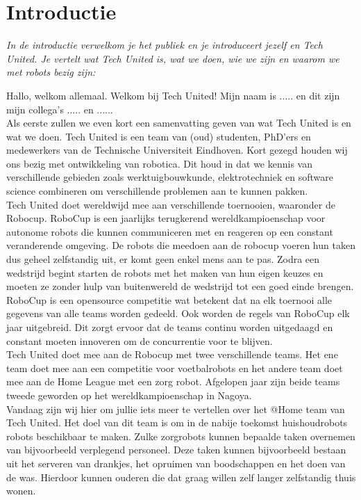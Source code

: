 \documentclass[a4paper,10pt]{article}
\numberwithin{equation}{section}
\numberwithin{figure}{section}
\numberwithin{table}{section}
\begin{document}
\section*{Introductie}
\textit{In de introductie verwelkom je het publiek en je introduceert jezelf en Tech United. Je vertelt wat Tech United is, wat we doen, wie we zijn en waarom we met robots bezig zijn:}\

Hallo, welkom allemaal. Welkom bij Tech United! Mijn naam is ..... en dit zijn mijn collega’s ..... en ...... \\

Als eerste zullen we even kort een samenvatting geven van wat Tech United is en wat we doen. Tech United is een team van (oud) studenten, PhD'ers en medewerkers van de Technische Universiteit Eindhoven. Kort gezegd houden wij ons bezig met ontwikkeling van robotica. Dit houd in dat we kennis van verschillende gebieden zoals werktuigbouwkunde, elektrotechniek en software science combineren om verschillende problemen aan te kunnen pakken.\\

Tech United doet wereldwijd mee aan verschillende toernooien, waaronder de Robocup. RoboCup is een jaarlijks terugkerend wereldkampioenschap voor autonome robots die kunnen communiceren met en reageren op een constant veranderende omgeving. De robots die meedoen aan de robocup voeren hun taken dus geheel zelfstandig uit, er komt geen enkel mens aan te pas. Zodra een wedstrijd begint starten de robots met het maken van hun eigen keuzes en moeten ze zonder hulp van buitenwereld de wedstrijd tot een goed einde brengen. RoboCup is een opensource competitie wat betekent dat na elk toernooi alle gegevens van alle teams worden gedeeld. Ook worden de regels van RoboCup elk jaar uitgebreid. Dit zorgt ervoor dat de teams continu worden uitgedaagd en constant moeten innoveren om de concurrentie voor te blijven.\\

Tech United doet mee aan de Robocup met twee verschillende teams. Het ene team doet mee aan een competitie voor voetbalrobots en het andere team doet mee aan de \@ Home League met een zorg robot. Afgelopen jaar zijn beide teams tweede geworden op het wereldkampioenschap in Nagoya.\\

Vandaag zijn wij hier om jullie iets meer te vertellen over het @Home team van Tech United. Het doel van dit team is om in de nabije toekomst huishoudrobots robots beschikbaar te maken. Zulke zorgrobots kunnen bepaalde taken overnemen van bijvoorbeeld verplegend personeel. Deze taken kunnen bijvoorbeeld bestaan uit het serveren van drankjes, het opruimen van boodschappen en het doen van de was. Hierdoor kunnen ouderen die dat graag willen zelf langer zelfstandig thuis wonen. 
\end{document}

